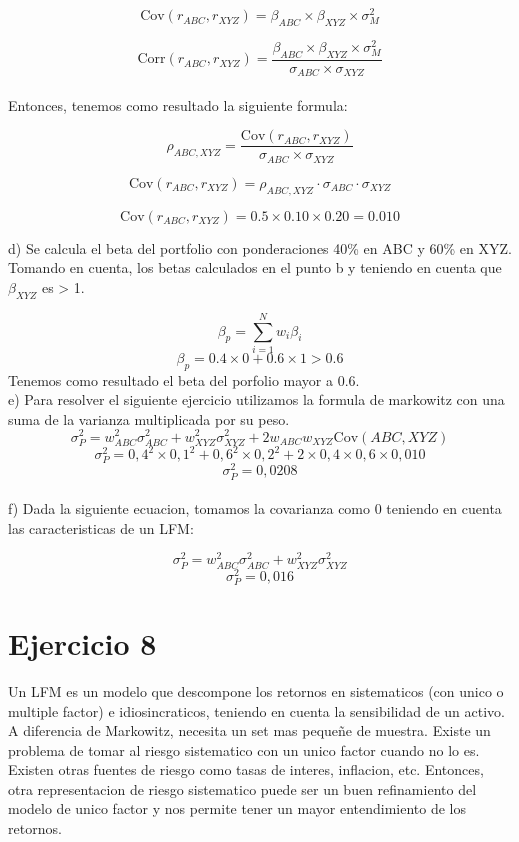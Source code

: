 \documentclass{article}
\begin{document}
\[
\mathrm{Cov}(r_{ABC}, r_{XYZ}) = \beta_{ABC} \times \beta_{XYZ} \times \sigma_M^2
\]


\[
 \mathrm{Corr}(r_{ABC}, r_{XYZ}) = \frac{\beta_{ABC} \times \beta_{XYZ} \times \sigma_M^2}{\sigma_{ABC} \times \sigma_{XYZ}}
\]
\\
Entonces, tenemos como resultado la siguiente formula:

\[
 \rho_{ABC,XYZ}= \frac{\mathrm{Cov}(r_{ABC}, r_{XYZ})}{\sigma_{ABC} \times \sigma_{XYZ}}
\]


\[
\mathrm{Cov}(r_{ABC}, r_{XYZ}) = \rho_{ABC,XYZ} \cdot \sigma_{ABC} \cdot \sigma_{XYZ}
\]

\[
\mathrm{Cov}(r_{ABC}, r_{XYZ}) = 0.5 \times 0.10 \times 0.20 = 0.010
\]


d) Se calcula el beta del portfolio con ponderaciones 40\% en ABC y 60\% en XYZ. Tomando en cuenta, los betas calculados en 
el punto b y teniendo en cuenta que $\beta_{XYZ}$ es > 1. 

\[
\beta_p = \sum_{i=1}^{N} w_i \beta_i
\]
\[
\beta_p = 0.4 \times 0 + 0.6 \times 1 > 0.6 
\]
Tenemos como resultado el beta del porfolio mayor a 0.6. 
\\

e) Para resolver el siguiente ejercicio utilizamos la formula de markowitz con una suma de la varianza multiplicada por su peso.
\[
\sigma_P^2 = w_{ABC}^2 \sigma_{ABC}^2 + w_{XYZ}^2 \sigma_{XYZ}^2 + 2 w_{ABC} w_{XYZ}  \mathrm{Cov}(ABC, XYZ)
\]
\[
\sigma_P^2 = 0,4^2 \times 0,1^2 + 0,6^2 \times0,2^2 + 2 \times 0,4 \times 0,6  \times 0,010
\]
\[
\sigma_P^2 = 0,0208
\]
\\

f) Dada la siguiente ecuacion, tomamos la covarianza como 0 teniendo en cuenta las caracteristicas de un LFM:

\[
\sigma_P^2 = w_{ABC}^2 \sigma_{ABC}^2 + w_{XYZ}^2 \sigma_{XYZ}^2 
\]
\[
\sigma_P^2 = 0,016
\]


\section{Ejercicio 8}
Un LFM es un modelo que descompone los retornos en sistematicos (con unico o multiple factor) e idiosincraticos, teniendo en cuenta la sensibilidad de un activo. A diferencia de Markowitz, necesita un set mas pequeñe de muestra. Existe un problema de tomar
al riesgo sistematico con un unico factor cuando no lo es. Existen otras fuentes de riesgo como tasas de interes, inflacion, etc. 
Entonces, otra representacion de riesgo sistematico puede ser un buen refinamiento del modelo de unico factor y nos permite tener un mayor entendimiento de los retornos.
\end{document}
